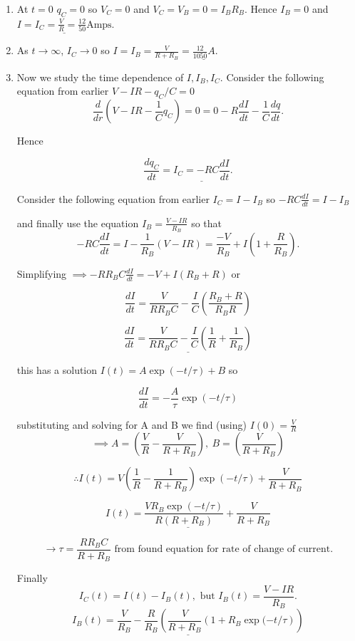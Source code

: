 \begin{enumerate}
	\item  At $t=0$ $q_C=0$ so $V_C=0$ and $V_C=V_B=0=I_BR_B$. Hence $I_B=0$ and $\underline{I=I_C=\frac{V}{R}=\frac{12}{50}\textrm{Amps}}$.
	\vspace{5mm}
	
	\item As $t\rightarrow \infty$, $I_C\rightarrow 0$ so $I=I_B=\frac{V}{R+R_B}=\underline{\frac{12}{1050}A}$.
	\vspace{5mm}
	
	\item Now we study the time dependence of $I,I_B,I_C$. Consider the following equation from earlier $V-IR-q_C/C=0$
	$$\frac{d}{dr}\left(V-IR-\frac{1}{C}{q_C}\right)=0=0-R\frac{dI}{dt}-\frac{1}{C}\frac{dq}{dt}.$$
	
	Hence
	
	$$\frac{dq_C}{dt}=\underline{I_C=-RC\frac{dI}{dt}}.$$
	
	Consider the following equation from earlier $I_C=I-I_B$ so $-RC\frac{dI}{dt}=I-I_B$
	
	and finally use the equation $I_B=\frac{V-IR}{R_B}$ so that $$-RC\frac{dI}{dt}=I-\frac{1}{R_B}(V-IR)=\frac{-V}{R_B}+I(1+\frac{R}{R_B}).$$
	
	Simplifying $\implies -RR_BC\frac{dI}{dt}=-V+I(R_B+R)$ or 
	
	$$\frac{dI}{dt}=\frac{V}{RR_BC}-\frac{I}{C}\left(\frac{R_B+R}{R_BR}\right)$$
	
	$$\underline{\frac{dI}{dt}=\frac{V}{RR_BC}-\frac{I}{C} \left(\frac{1}{R}+\frac{1}{R_B}\right)}$$
	
	this has a solution $I(t)=A\exp(-t/\tau)+B$ so
	
	$$\frac{dI}{dt}=-\frac{A}{\tau}\exp(-t/\tau)$$
	
	substituting and solving for A and B we find (using) $I(0)=\frac{V}{R}$
	$$\implies A= \left(\frac{V}{R}-\frac{V}{R+R_B}\right), \: B=\left(\frac{V}{R+R_B}\right)$$
	
	$$\therefore I(t)=V\left(\frac{1}{R}-\frac{1}{R+R_B}\right)\exp(-t/\tau)+\frac{V}{R+R_B}$$
	
	$$\underline{I(t) = \frac{VR_B\exp(-t/\tau)}{R(R+R_B)}+\frac{V}{R+R_B}}$$
	
	$$\rightarrow \tau=\frac{RR_BC}{R+R_B} \textrm{ from found equation for rate of change of current.}$$
	
	Finally
	$$I_C(t)=I(t)-I_B(t),\textrm{ but } I_B(t)=\frac{V-IR}{R_B}.$$
	$$\underline{I_B(t)=\frac{V}{R_B}-\frac{R}{R_B}\left(\frac{V}{R+R_B}\left(1+R_B\exp(-t/\tau\right)\right)}$$
	

\end{enumerate}
